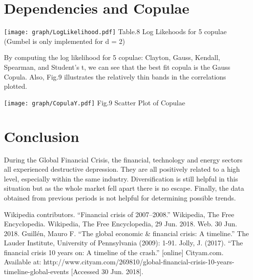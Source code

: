 \documentclass[11pt]{article}
\begin{document}
\section{Dependencies and Copulae}\vspace{-1em}
\begin{center}
  \texttt{[image: graph/LogLikelihood.pdf]}
  Table.8 Log Likehoods for 5 copulae (Gumbel is only implemented for d = 2)
\end{center}
By computing the log likelihood for 5 copulae: Clayton, Gauss, Kendall, Spearman, and Student's t, we can see that the best fit copula is the Gauss Copula. Also, Fig.9 illustrates the relatively thin bands in the correlations plotted.
\begin{center}\vspace{-1em}
  \texttt{[image: graph/CopulaY.pdf]}
  Fig.9 Scatter Plot of Copulae
\end{center}


\section{Conclusion}\vspace{-1em}
During the Global Financial Crisis, the financial, technology and energy sectors all experienced destructive depression. They are all positively related to a high level, especially within the same industry. Diversification is still helpful in this situation but as the whole market fell apart there is no escape. Finally, the data obtained from previous periods is not helpful for determining possible trends.


\vspace{-0.8em}
\begin{thebibliography}{9}
 Wikipedia contributors. ``Financial crisis of 2007–2008.'' Wikipedia, The Free Encyclopedia. Wikipedia, The Free Encyclopedia, 29 Jun. 2018. Web. 30 Jun. 2018.
 Guillén, Mauro F. ``The global economic \& financial crisis: A timeline.'' The Lauder Institute, University of Pennsylvania (2009): 1-91.
 Jolly, J. (2017). ``The financial crisis 10 years on: A timeline of the crash.'' [online] Cityam.com. Available at: http://www.cityam.com/269810/global-financial-crisis-10-years-timeline-global-events [Accessed 30 Jun. 2018].
\end{thebibliography}
\end{document}

